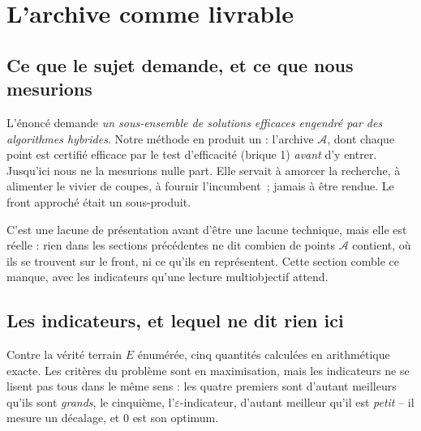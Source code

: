 \documentclass[11pt,a4paper]{article}
\theoremstyle{plain}
\theoremstyle{remark}
\begin{document}
\section{L'archive comme livrable}
\label{sec:livrable}

\subsection{Ce que le sujet demande, et ce que nous mesurions}

L'énoncé demande \emph{un sous-ensemble de solutions efficaces engendré par
des algorithmes hybrides}. Notre méthode en produit un : l'archive
$\mathcal{A}$, dont chaque point est certifié efficace par le test
d'efficacité (brique 1)
\emph{avant} d'y entrer. Jusqu'ici nous ne la mesurions nulle part. Elle
servait à amorcer la recherche, à alimenter le vivier de coupes, à fournir
l'incumbent~; jamais à être rendue. Le front approché était un sous-produit.

C'est une lacune de présentation avant d'être une lacune technique, mais
elle est réelle : rien dans les sections précédentes ne dit combien de
points $\mathcal{A}$ contient, où ils se trouvent sur le front, ni ce qu'ils
en représentent. Cette section comble ce manque, avec les indicateurs qu'une
lecture multiobjectif attend.

\subsection{Les indicateurs, et lequel ne dit rien ici}

Contre la vérité terrain $E$ énumérée, cinq quantités calculées en
arithmétique exacte. Les critères du problème sont en maximisation, mais les
indicateurs ne se lisent pas tous dans le même sens : les quatre premiers
sont d'autant meilleurs qu'ils sont \emph{grands}, le cinquième,
l'$\varepsilon$-indicateur, d'autant meilleur qu'il est \emph{petit} -- il
mesure un décalage, et $0$ est son optimum.
\end{document}
